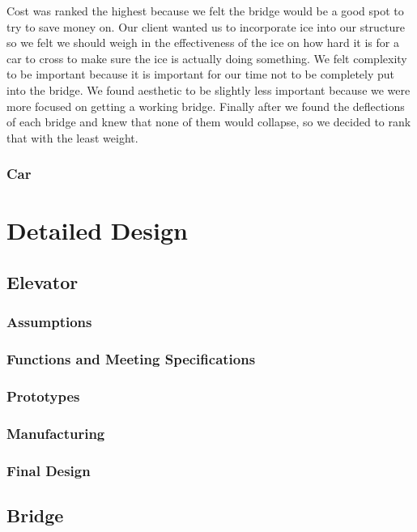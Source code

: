 \documentclass[fleqn,12pt]{project}
\begin{document}
Cost was ranked the highest because we felt the bridge would be a good spot to try to save money on. Our client wanted us to incorporate ice into our structure so we felt we should weigh in the effectiveness of the ice on how hard it is for a car to cross to make sure the ice is actually doing something. We felt complexity to be important because it is important for our time not to be completely put into the bridge. We found aesthetic to be slightly less important because we were more focused on getting a working bridge. Finally after we found the deflections of each bridge and knew that none of them would collapse, so we decided to rank that with the least weight.

\subsubsection{Car}

\newpage
\section{Detailed Design}
\subsection{Elevator}
\subsubsection{Assumptions}
\subsubsection{Functions and Meeting Specifications}
\subsubsection{Prototypes}
\subsubsection{Manufacturing}
\subsubsection{Final Design}

\subsection{Bridge}
\end{document}
